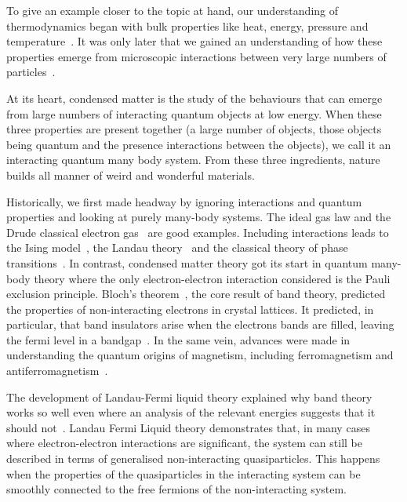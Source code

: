To give an example closer to the topic at hand, our understanding of thermodynamics began with bulk properties like heat, energy, pressure and temperature~\autocite{saslowHistoryThermodynamicsMissing2020}. It was only later that we gained an understanding of how these properties emerge from microscopic interactions between very large numbers of particles~\autocite{flammHistoryOutlookStatistical1998}.

At its heart, condensed matter is the study of the behaviours that can emerge from large numbers of interacting quantum objects at low energy. When these three properties are present together (a large number of objects, those objects being quantum and the presence interactions between the objects), we call it an interacting quantum many body system. From these three ingredients, nature builds all manner of weird and wonderful materials.

Historically, we first made headway by ignoring interactions and quantum properties and looking at purely many-body systems. The ideal gas law and the Drude classical electron gas~\autocite{ashcroftSolidStatePhysics1976} are good examples. Including interactions leads to the Ising model~\autocite{isingBeitragZurTheorie1925}, the Landau theory~\autocite{landau2013fluid} and the classical theory of phase transitions~\autocite{jaegerEhrenfestClassificationPhase1998}. In contrast, condensed matter theory got its start in quantum many-body theory where the only electron-electron interaction considered is the Pauli exclusion principle. Bloch's theorem~\autocite{blochÜberQuantenmechanikElektronen1929}, the core result of band theory, predicted the properties of non-interacting electrons in crystal lattices. It predicted, in particular, that band insulators arise when the electrons bands are filled, leaving the fermi level in a bandgap~\autocite{ashcroftSolidStatePhysics1976}. In the same vein, advances were made in understanding the quantum origins of magnetism, including ferromagnetism and antiferromagnetism~\autocite{MagnetismCondensedMatter}.

The development of Landau-Fermi liquid theory explained why band theory works so well even where an analysis of the relevant energies suggests that it should not~\autocite{wenQuantumFieldTheory2007}. Landau Fermi Liquid theory demonstrates that, in many cases where electron-electron interactions are significant, the system can still be described in terms of generalised non-interacting quasiparticles. This happens when the properties of the quasiparticles in the interacting system can be smoothly connected to the free fermions of the non-interacting system.

